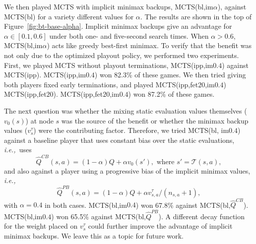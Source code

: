 \documentclass[conference]{IEEEtran}
\newcommand{\cT}{\mathcal{T}}
\newcommand{\hQ}{\hat{Q}}
\newcommand{\ie}{{\it i.e.,}~}
\newcounter{mlNoteCounter}
\newcommand{\mlnote}[1]{{\scriptsize \color{darkgreen} $\blacksquare$ \refstepcounter{mlNoteCounter}\textsf{[ML]$_{\arabic{mlNoteCounter}}$:{#1}}}}
\begin{document}
We then played MCTS with implicit minimax backups, MCTS(bl,im$\alpha$), against MCTS(bl) for a 
variety different values for $\alpha$. The results are shown in the top of Figure~\ref{fig:bt-base-alpha}.
Implicit minimax backups give an advantage for $\alpha \in [0.1,0.6]$ under both one- and five-second 
search times. 
When $\alpha > 0.6$, MCTS(bl,im$\alpha$) acts like greedy best-first minimax.
To verify that the benefit was not only due to the optimized playout policy, we performed two experiments. 
First, we played MCTS without playout terminations, MCTS(ipp,im$0.4$) against MCTS(ipp). 
MCTS(ipp,im$0.4$) won 82.3\% of these games. 
We then tried giving both players fixed early terminations, and played MCTS(ipp,fet$20$,im$0.4$) 
MCTS(ipp,fet$20$). MCTS(ipp,fet$20$,im$0.4$) won 87.2\% of these games.

 
The next question was whether the mixing static evaluation values themselves ($v_0(s)$) at node $s$ 
was the source of the benefit or whether the minimax backup values ($v^{\tau}_s$) were the contributing factor.
Therefore, we tried MCTS(bl, im$0.4$) against a baseline player that uses constant bias over the static 
evaluations, \ie uses 
\[ \hQ^{CB}(s,a) = (1-\alpha)Q + \alpha v_0(s'), \mbox{ where } s' = \cT(s,a),\]
and also against a player using a progressive bias of the implicit minimax values, \ie 
\[ \hQ^{PB}(s,a) = (1-\alpha)Q + \alpha v^{\tau}_{s,a}/(n_{s,a} + 1), \]
with $\alpha = 0.4$ in both cases.
MCTS(bl,im$0.4$) won 67.8\% against MCTS(bl,$\hQ^{CB}$). 
MCTS(bl,im$0.4$) won 65.5\% against MCTS(bl,$\hQ^{PB}$). 
A different decay function for the weight placed on $v^{\tau}_s$ could further improve 
the advantage of implicit minimax backups. We leave this as a topic for future work. 
\end{document}
